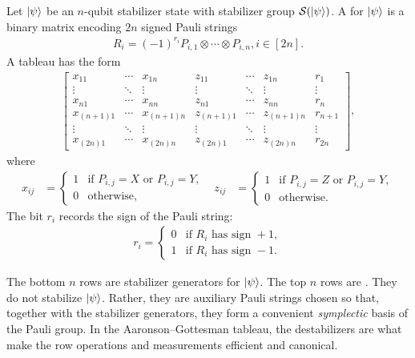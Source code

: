 \begin{definition}
\label{def:tableau}
Let $\ket\psi$ be an $n$-qubit stabilizer state with stabilizer group
$\mathcal S(\ket\psi)$. A  for $\ket\psi$ is a binary matrix
encoding $2n$ signed Pauli strings
\begin{align}
    R_i = (-1)^{r_i} P_{i,1} \otimes \cdots \otimes P_{i,n},
    i \in [2n].
\end{align}
A tableau has the form
\begin{align}
\left[
\begin{array}{ccc|ccc|c}
x_{11} & \cdots & x_{1n}
&
z_{11} & \cdots & z_{1n}
&
r_1
\\
\vdots & \ddots & \vdots
&
\vdots & \ddots & \vdots
&
\vdots
\\
x_{n1} & \cdots & x_{nn}
&
z_{n1} & \cdots & z_{nn}
&
r_n
\\
\hline
x_{(n+1)1} & \cdots & x_{(n+1)n}
&
z_{(n+1)1} & \cdots & z_{(n+1)n}
&
r_{n+1}
\\
\vdots & \ddots & \vdots
&
\vdots & \ddots & \vdots
&
\vdots
\\
x_{(2n)1} & \cdots & x_{(2n)n}
&
z_{(2n)1} & \cdots & z_{(2n)n}
&
r_{2n}
\end{array}
\right],
\end{align}
where
\begin{align}
x_{ij}
&=
\begin{cases}
1 & \text{if } P_{i,j}=X \text{ or } P_{i,j}=Y, \\
0 & \text{otherwise,}
\end{cases}
&
z_{ij}
&=
\begin{cases}
1 & \text{if } P_{i,j}=Z \text{ or } P_{i,j}=Y, \\
0 & \text{otherwise.}
\end{cases}
\end{align}
The bit $r_i$ records the sign of the Pauli string:
\begin{align}
    r_i =
    \begin{cases}
    0 & \text{if } R_i \text{ has sign } +1,\\
    1 & \text{if } R_i \text{ has sign } -1.
    \end{cases}
\end{align}

The bottom $n$ rows are stabilizer generators for $\ket\psi$. The top $n$
rows are . They do not stabilize $\ket\psi$.
Rather, they are auxiliary Pauli strings chosen so that, together with the
stabilizer generators, they form a convenient \emph{symplectic} basis of the Pauli
group. In the Aaronson--Gottesman tableau, the destabilizers are what make the
row operations and measurements efficient and canonical.
\end{definition}

